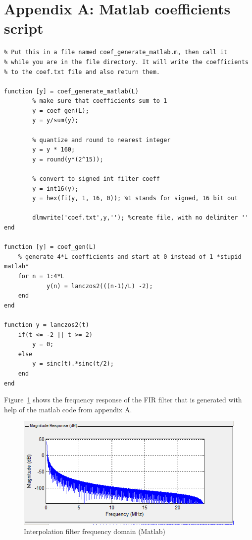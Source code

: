 \documentclass[a4paper,twoside,11pt, fleqn]{article}
\begin{document}
\section{Appendix A: Matlab coefficients script}
\begin{lstlisting}
% Put this in a file named coef_generate_matlab.m, then call it 
% while you are in the file directory. It will write the coefficients
% to the coef.txt file and also return them.

function [y] = coef_generate_matlab(L)
        % make sure that coefficients sum to 1
        y = coef_gen(L);
        y = y/sum(y);

        % quantize and round to nearest integer
        y = y * 160;
        y = round(y*(2^15)); 
             
        % convert to signed int filter coeff
        y = int16(y);
        y = hex(fi(y, 1, 16, 0)); %1 stands for signed, 16 bit out
        
        dlmwrite('coef.txt',y,''); %create file, with no delimiter ''      
end

function [y] = coef_gen(L)
    % generate 4*L coefficients and start at 0 instead of 1 *stupid matlab*
    for n = 1:4*L
            y(n) = lanczos2(((n-1)/L) -2);
    end
end

function y = lanczos2(t)
    if(t <= -2 || t >= 2)
        y = 0;
    else
        y = sinc(t).*sinc(t/2);
    end
end
\end{lstlisting}

Figure~\ref{fig:frq} shows the frequency response of the FIR filter that is generated with help of the matlab code from appendix A.

\begin{figure}[h]
	\includegraphics[scale=0.67]{Images/frequencyplot}
    \caption{Interpolation filter frequency domain (Matlab)}
    \label{fig:frq}
\end{figure}
\end{document}
